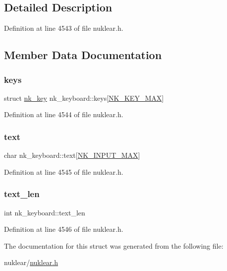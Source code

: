 \subsection{Detailed Description}


Definition at line 4543 of file nuklear.\+h.



\subsection{Member Data Documentation}
\mbox{\label{structnk__keyboard_a7f4bc6e6c826efeef5ac3ccfe7be2951}} 
\subsubsection{\texorpdfstring{keys}{keys}}
{\footnotesize\ttfamily struct \mbox{\hyperlink{structnk__key}{nk\+\_\+key}} nk\+\_\+keyboard\+::keys\mbox{[}\mbox{\hyperlink{nuklear_8h_a167b9acb4687d274e2553658a4a70933a6375e27bbfaa7223347a27dc18be51d3}{N\+K\+\_\+\+K\+E\+Y\+\_\+\+M\+AX}}\mbox{]}}



Definition at line 4544 of file nuklear.\+h.

\mbox{\label{structnk__keyboard_a9cdc372561fb571c1feb28837d5fc965}} 
\subsubsection{\texorpdfstring{text}{text}}
{\footnotesize\ttfamily char nk\+\_\+keyboard\+::text\mbox{[}\mbox{\hyperlink{nuklear_8h_a6e69058f808cd9f9af5c1b357dfdde57}{N\+K\+\_\+\+I\+N\+P\+U\+T\+\_\+\+M\+AX}}\mbox{]}}



Definition at line 4545 of file nuklear.\+h.

\mbox{\label{structnk__keyboard_a17efc7c3577ba4ff1b3eb4a46bc6f082}} 
\subsubsection{\texorpdfstring{text\+\_\+len}{text\_len}}
{\footnotesize\ttfamily int nk\+\_\+keyboard\+::text\+\_\+len}



Definition at line 4546 of file nuklear.\+h.



The documentation for this struct was generated from the following file\+:\begin{DoxyCompactItemize}
\item 
nuklear/\mbox{\hyperlink{nuklear_8h}{nuklear.\+h}}\end{DoxyCompactItemize}
